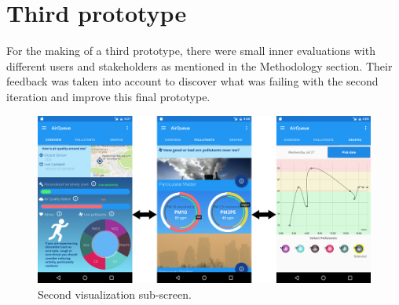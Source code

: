 \section{Third prototype}
For the making of a third prototype, there were small inner evaluations with different users and stakeholders as mentioned in the Methodology section. Their feedback was taken into account to discover what was failing with the second iteration and improve this final prototype. 

\begin{figure}[H]
\begin{adjustbox}{width=1.2\textwidth,center=\textwidth}
  \centering
  \includegraphics[scale=1]{images/thirdPrototype.png}
\end{adjustbox}
  \caption[Second visualization sub-screen]{Second visualization sub-screen.}
  \label{fig:third_prototype}
\end{figure}

